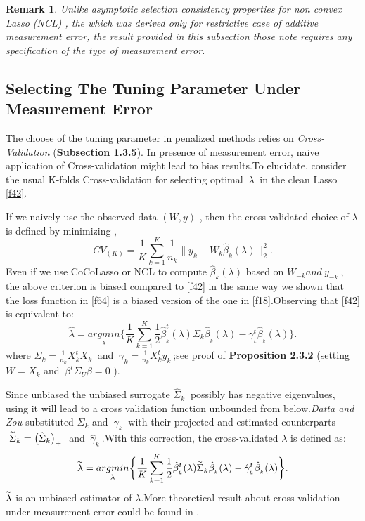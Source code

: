 \documentclass[12pt]{report}
\newtheorem{remarque}{Remark}[section]
\begin{document}
\begin{remarque}
	Unlike asymptotic selection consistency properties for non convex Lasso (NCL) , the which was derived only for restrictive case of additive measurement error, the result provided in this subsection those note requires any specification of the type of measurement error.
\end{remarque}
\subsection{Selecting The Tuning Parameter Under Measurement Error}
The choose of the tuning parameter in penalized methods  relies on \textit{Cross-Validation} (\textbf{Subsection 1.3.5}). In presence of measurement error, naive application of Cross-validation might lead to bias results.To elucidate, consider the usual K-folds Cross-validation  for selecting optimal $\ \lambda\ $ in the clean Lasso \eqref{f42}.

If we naively use the observed data $(W,y)$ , then the cross-validated choice of $\lambda$ is defined by minimizing ,
\begin{equation}
CV_{(K)}	=\frac{1}{K} \sum_{k=1}^{K}\frac{1}{n_{k}}\parallel y_{k}-W_{k}\hat{\beta}_{k}(\lambda)\parallel_{2}^{2}.
\label{f80}
\end{equation}
Even if we use CoCoLasso or NCL to compute $\hat{\beta}_{k}(\lambda)$ based on $W_{-k} and\ y_{-k}\ $, the above criterion is biased compared to \eqref{f42} in the same way we shown that the loss function in \eqref{f64} is a biased version of the one in \eqref{f18}.Observing  that \eqref{f42} is equivalent to:
\begin{equation}
	\hat{\lambda}= \underset{\lambda}{argmin}\bigg\{\frac{1}{K}\sum_{k=1}^{K}\frac{1}{2}\hat{\beta}^{t}_{_{k}}(\lambda)\Sigma_{k}\hat{\beta}_{_{k}}(\lambda)-\gamma^{t}_{_{k}}\hat{\beta}_{_{k}}(\lambda)\bigg\}.
	\label{f81}
\end{equation}
where $\Sigma_{k}=\frac{1}{n_{k}}X_{k}^{t}X_{k}\ $ and $\ \gamma_{k}=\frac{1}{n_{k}}X_{k}^{t}y_{k}\ $;see proof of \textbf{Proposition 2.3.2 }(setting $W=X_{k}$ and $\ \beta^{t}\Sigma_{U}\beta=0$ ).


Since unbiased the unbiased surrogate $\hat{\Sigma}_{k}\ $ possibly has negative eigenvalues, using it will lead to a cross validation function unbounded from below.\textit{Datta and Zou \cite{nref18}} substituted $\Sigma_{k}$ and $\ \gamma_{k}\ $ with their projected and estimated counterparts $\ \overset{_{\thicksim}}{\Sigma}_{k}=\big(\hat{\Sigma}_{k}\big)_{+}\ $ and  $\ \hat{\gamma}_{k}\ $.With this correction, the cross-validated $\lambda$ is defined as:
\begin{equation}
		\overset{_{\thicksim}}{\lambda}= \underset{\lambda}{argmin}\bigg\{\frac{1}{K}\sum_{k=1}^{K}\frac{1}{2}\hat{\beta}^{t}_{_{k}}(\lambda)\overset{_{\thicksim}}{\Sigma}_{k}\hat{\beta}_{_{k}}(\lambda)-\hat{\gamma}^{t}_{_{k}}\hat{\beta}_{_{k}}(\lambda)\bigg\}.
\end{equation}
$\overset{_{\thicksim}}{\lambda}$ is an unbiased estimator  of $\lambda$.More theoretical result about cross-validation under measurement error could be found in \cite{nref25}.
\end{document}
